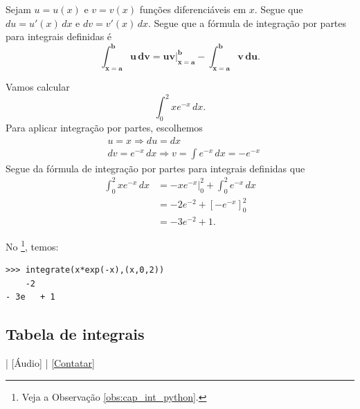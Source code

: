 Sejam $u=u(x)$ e $v=v(x)$ funções diferenciáveis em $x$. Segue que $du = u'(x)\,dx$ e $dv = v'(x)\,dx$. Segue que a fórmula de integração por partes para integrais definidas é
\begin{equation}
  \pmb{\int_{x=a}^b u\,dv = \left. uv \right|_{x=a}^b - \int_{x=a}^b v\,du}.
\end{equation}

\begin{ex}
  Vamos calcular
  \begin{equation}
    \int_0^2 xe^{-x}\,dx.
  \end{equation}
  Para aplicar integração por partes, escolhemos
  \begin{align}
    & u = x \Rightarrow du = dx \\
    & dv = e^{-x}\,dx \Rightarrow v = \int e^{-x}\,dx = -e^{-x}
  \end{align}
  Segue da fórmula de integração por partes para integrais definidas que
  \begin{align}
    \int_0^2 xe^{-x}\,dx &= \left. -xe^{-x}\right|_0^2 + \int_0^2 e^{-x}\,dx \\
                         &= -2e^{-2} + \left[-e^{-x}\right]_0^2 \\
                         &= -3e^{-2} + 1.
  \end{align}

  \ifispython
  No \sympy\footnote{Veja a Observação \ref{obs:cap_int_python}.}, temos:
\begin{verbatim}
>>> integrate(x*exp(-x),(x,0,2))
    -2    
- 3e   + 1
\end{verbatim}
  \fi
\end{ex}

\subsection{Tabela de integrais}

\begin{flushright}
  [Vídeo] | [Áudio] | \href{https://phkonzen.github.io/notas/contato.html}{[Contatar]}
\end{flushright}

